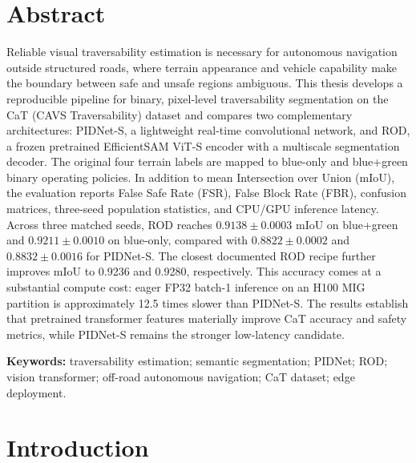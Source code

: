 \documentclass[12pt,a4paper]{report}
\begin{document}
\chapter*{Abstract}

Reliable visual traversability estimation is necessary for autonomous navigation
outside structured roads, where terrain appearance and vehicle capability make
the boundary between safe and unsafe regions ambiguous. This thesis develops a
reproducible pipeline for binary, pixel-level traversability segmentation on the
CaT (CAVS Traversability) dataset and compares two complementary architectures:
PIDNet-S, a lightweight real-time convolutional network, and ROD, a frozen
pretrained EfficientSAM ViT-S encoder with a multiscale segmentation decoder.
The original four terrain labels are mapped to blue-only and blue+green binary
operating policies. In addition to mean Intersection over Union (mIoU), the
evaluation reports False Safe Rate (FSR), False Block Rate (FBR), confusion
matrices, three-seed population statistics, and CPU/GPU inference latency. Across
three matched seeds, ROD reaches $0.9138\pm0.0003$ mIoU on blue+green and
$0.9211\pm0.0010$ on blue-only, compared with $0.8822\pm0.0002$ and
$0.8832\pm0.0016$ for PIDNet-S. The closest documented ROD recipe further
improves mIoU to 0.9236 and 0.9280, respectively. This accuracy comes at a
substantial compute cost: eager FP32 batch-1 inference on an H100 MIG partition
is approximately 12.5 times slower than PIDNet-S. The results establish that
pretrained transformer features materially improve CaT accuracy and safety
metrics, while PIDNet-S remains the stronger low-latency candidate.

\noindent\textbf{Keywords:} traversability estimation; semantic segmentation;
PIDNet; ROD; vision transformer; off-road autonomous navigation; CaT dataset;
edge deployment.

\clearpage
\tableofcontents
\clearpage
{}
{}
\listoffigures
\clearpage
{}
{}
\listoftables
\clearpage
{}

\chapter{Introduction}
\label{sec:introduction}
\end{document}
